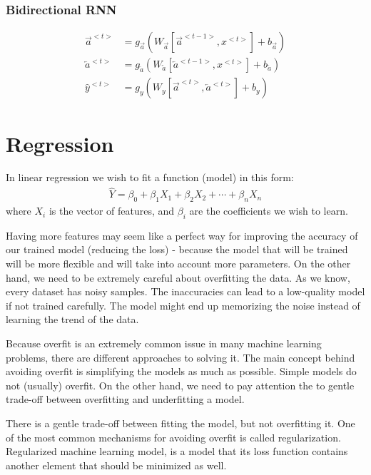 \documentclass{book}
\begin{document}
\subsection{Bidirectional RNN}
\begin{align*}
{\overrightarrow{a}}^{<t>} &= g_{\overrightarrow{a}}(W_{{\overrightarrow{a}}}[{\overrightarrow{a}}^{<t-1>},x^{<t>}] + b_{{\overrightarrow{a}}}) \\
{\overleftarrow{a}}^{<t>} &= g_{\overleftarrow{a}}(W_{{\overleftarrow{a}}}[{\overleftarrow{a}}^{<t-1>},x^{<t>}] + b_{{\overleftarrow{a}}}) \\
\hat{y}^{<t>} &= g_y(W_{y}[\overrightarrow{a}^{<t>}, \overleftarrow{a}^{<t>}] +b_{y})
\end{align*}

\chapter{Regression}
In linear regression we wish to fit a function (model) in this form:
\begin{align*}
\hat{Y} = \beta_0 + \beta_1 X_1  + \beta_2 X_2 + \cdots + \beta_n X_n
\end{align*}
where $X_i$ is the vector of features, and $\beta_i$ are the coefficients we wish to learn.

Having more features may seem like a perfect way for improving the accuracy of our trained model (reducing the loss) - because the model that will be trained will be more flexible and will take into account more parameters. On the other hand, we need to be extremely careful about overfitting the data. As we know, every dataset has noisy samples. 
The inaccuracies can lead to a low-quality model if not trained carefully. The model might end up memorizing the noise instead of learning the trend of the data.

Because overfit is an extremely common issue in many machine learning problems, there are different approaches to solving it. The main concept behind avoiding overfit is simplifying the models as much as possible. Simple models do not (usually) overfit. On the other hand, we need to pay attention the to gentle trade-off between overfitting and underfitting a model.

There is a gentle trade-off between fitting the model, but not overfitting it. 
One of the most common mechanisms for avoiding overfit is called regularization. Regularized machine learning model, is a model that its loss function contains another element that should be minimized as well.
\end{document}
